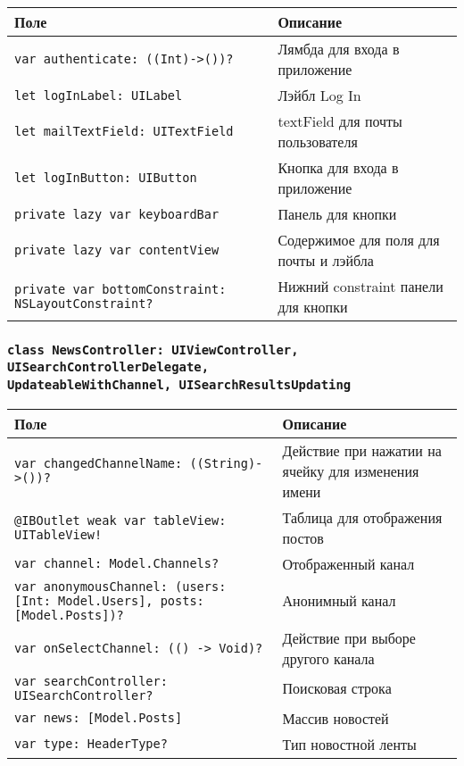 \begin{longtable}{| >{\raggedright\arraybackslash}p{} | p{}|}
\hline
\textbf{Поле} & \textbf{Описание} \\ \hline
\texttt{var authenticate: ((Int)->())?} & {Лямбда для входа в приложение} \\ \hline
\texttt{let logInLabel: UILabel } & {Лэйбл Log In} \\ \hline
\texttt{let mailTextField: UITextField } & {textField для почты пользователя} \\ \hline
\texttt{let logInButton: UIButton } & {Кнопка для входа в приложение} \\ \hline
\texttt{private lazy var keyboardBar } & {Панель для кнопки} \\ \hline
\texttt{private lazy var contentView } & {Содержимое для поля для почты и лэйбла} \\ \hline
\texttt{private var bottomConstraint: NSLayoutConstraint?} & {Нижний constraint панели для кнопки} \\ \hline
\end{longtable}

\subsubsection*{\texttt{class NewsController: UIViewController, UISearchControllerDelegate,\\ UpdateableWithChannel, UISearchResultsUpdating}}

\begin{longtable}{| >{\raggedright\arraybackslash}p{} | p{}|}
\hline
\textbf{Поле} & \textbf{Описание} \\ \hline
\texttt{var changedChannelName: ((String)->())?} & {Действие при нажатии на ячейку для изменения имени} \\ \hline
\texttt{@IBOutlet weak var tableView: UITableView!} & {Таблица для отображения постов} \\ \hline
\texttt{var channel: Model.Channels?} & {Отображенный канал} \\ \hline
\texttt{var anonymousChannel: (users: [Int: Model.Users], posts: [Model.Posts])?} & {Анонимный канал} \\ \hline
\texttt{var onSelectChannel: (() -> Void)?} & {Действие при выборе другого канала} \\ \hline
\texttt{var searchController: UISearchController?} & {Поисковая строка} \\ \hline
\texttt{var news: [Model.Posts] } & {Массив новостей} \\ \hline
\texttt{var type: HeaderType? } & {Тип новостной ленты} \\ \hline
\end{longtable}

